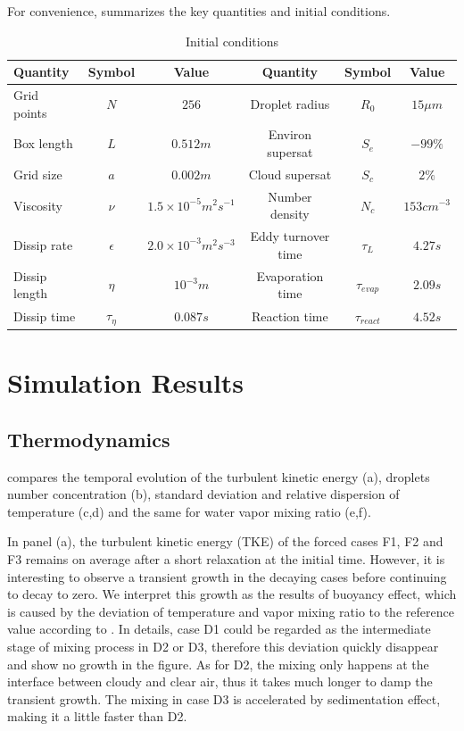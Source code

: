 For convenience,  summarizes the key quantities and initial conditions.
\begin{table}[h]
\begin{tabular}{l c c c c c}
\hline\hline
Quantity & Symbol & Value & Quantity & Symbol & Value\\
\hline
Grid points & $N$ & $256$ & Droplet radius & $R_{0}$ & $15\mu m$\\
Box length & $L$ & $0.512m$ & Environ supersat & $S_{e}$ & $-99\%$\\
Grid size & $a$ & $0.002m$ & Cloud supersat & $S_{c}$ & $2\%$\\
Viscosity & $\nu$ & $1.5\times10^{-5}m^{2}s^{-1}$ & Number density& $N_{c}$ & $153cm^{-3}$\\
Dissip rate& $\epsilon$ & $2.0\times10^{-3}m^{2}s^{-3}$ & Eddy turnover time & $\tau_{L}$ & $4.27s$\\
Dissip length& $\eta$ & $10^{-3}m$ & Evaporation time & $\tau_{evap}$ & $2.09s$\\
Dissip time& $\tau_{\eta}$ & $0.087s$ & Reaction time & $\tau_{react}$ & $4.52s$\\
\hline
\end{tabular}
\caption{Initial conditions}
\label{tb:parameters}
\end{table}

\section{Simulation Results}
\subsection{Thermodynamics}
 compares the temporal evolution of the turbulent kinetic
energy (a), droplets number concentration (b), standard deviation and relative
dispersion of temperature (c,d) and the same for water vapor mixing ratio
(e,f).

In panel (a), the turbulent kinetic energy (TKE) of the forced cases F1, F2 and
F3 remains on average after a short relaxation at the initial time. However, it
is interesting to observe a transient growth in the decaying cases before
continuing to decay to zero. We interpret this growth as the results of
buoyancy effect, which is caused by the deviation of temperature and vapor
mixing ratio to the reference value according to . In
details, case D1 could be regarded as the intermediate stage of mixing process
in D2 or D3, therefore this deviation quickly disappear and show no growth in
the figure. As for D2, the mixing only happens at the interface between cloudy
and clear air, thus it takes much longer to damp the transient growth. The
mixing in case D3 is accelerated by sedimentation effect, making it a little
faster than D2.

